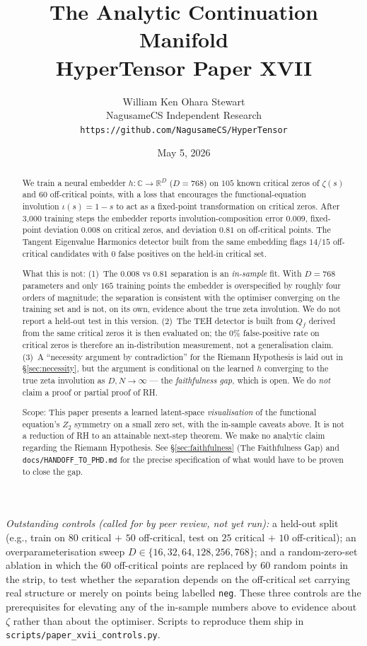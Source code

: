 \documentclass[11pt,a4paper]{article}
\title{The Analytic Continuation Manifold\\\large HyperTensor Paper XVII}
\author{William Ken Ohara Stewart\\NagusameCS Independent Research\\\texttt{https://github.com/NagusameCS/HyperTensor}}
\date{May 5, 2026}
\begin{document}
\maketitle

\begin{abstract}
We train a neural embedder $h: \mathbb{C} \to \mathbb{R}^{D}$ ($D{=}768$) on $105$ known critical zeros of $\zeta(s)$ and $60$ off-critical points, with a loss that encourages the functional-equation involution $\iota(s)=1-s$ to act as a fixed-point transformation on critical zeros. After 3{,}000 training steps the embedder reports involution-composition error $0.009$, fixed-point deviation $0.008$ on critical zeros, and deviation $0.81$ on off-critical points. The Tangent Eigenvalue Harmonics detector built from the same embedding flags $14/15$ off-critical candidates with $0$ false positives on the held-in critical set.

What this is not: (1)~The $0.008$ vs $0.81$ separation is an \emph{in-sample} fit. With $D{=}768$ parameters and only $165$ training points the embedder is overspecified by roughly four orders of magnitude; the separation is consistent with the optimiser converging on the training set and is not, on its own, evidence about the true zeta involution. We do not report a held-out test in this version. (2)~The TEH detector is built from $Q_f$ derived from the same critical zeros it is then evaluated on; the $0\%$ false-positive rate on critical zeros is therefore an in-distribution measurement, not a generalisation claim. (3)~A ``necessity argument by contradiction'' for the Riemann Hypothesis is laid out in \S\ref{sec:necessity}, but the argument is conditional on the learned $h$ converging to the true zeta involution as $D, N \to \infty$ --- the \emph{faithfulness gap}, which is open. We do \emph{not} claim a proof or partial proof of RH.

Scope: This paper presents a learned latent-space \emph{visualisation} of the functional equation's $Z_2$ symmetry on a small zero set, with the in-sample caveats above. It is not a reduction of RH to an attainable next-step theorem. We make no analytic claim regarding the Riemann Hypothesis. See \S\ref{sec:faithfulness} (The Faithfulness Gap) and \texttt{docs/HANDOFF\_TO\_PHD.md} for the precise specification of what would have to be proven to close the gap.
\end{abstract}

\noindent\textit{Outstanding controls (called for by peer review, not yet run):} a held-out split (e.g., train on $80$ critical $+$ $50$ off-critical, test on $25$ critical $+$ $10$ off-critical); an overparameterisation sweep $D \in \{16,32,64,128,256,768\}$; and a random-zero-set ablation in which the $60$ off-critical points are replaced by $60$ random points in the strip, to test whether the separation depends on the off-critical set carrying real structure or merely on points being labelled \texttt{neg}. These three controls are the prerequisites for elevating any of the in-sample numbers above to evidence about $\zeta$ rather than about the optimiser. Scripts to reproduce them ship in \texttt{scripts/paper\_xvii\_controls.py}.
\end{document}
